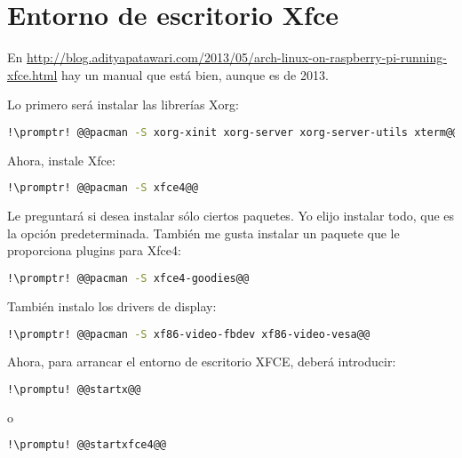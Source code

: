 \section{Entorno de escritorio Xfce}\label{sec:rasp-xfce}
En \url{http://blog.adityapatawari.com/2013/05/arch-linux-on-raspberry-pi-running-xfce.html} hay un manual que
está bien, aunque es de 2013.

Lo primero será instalar las librerías Xorg:

\begin{lstlisting}[gobble=2,language=bash,style=bashinteract,escapechar=!]
  !\promptr! @@pacman -S xorg-xinit xorg-server xorg-server-utils xterm@@
\end{lstlisting}

\noindent Ahora, instale Xfce:

\begin{lstlisting}[gobble=2,language=bash,style=bashinteract,escapechar=!]
  !\promptr! @@pacman -S xfce4@@
\end{lstlisting}

\noindent Le preguntará si desea instalar sólo ciertos paquetes. Yo elijo instalar todo, que es la opción
predeterminada. También me gusta instalar un paquete que le proporciona plugins para Xfce4:

\begin{lstlisting}[gobble=2,language=bash,style=bashinteract,escapechar=!]
  !\promptr! @@pacman -S xfce4-goodies@@
\end{lstlisting}

\noindent También instalo los drivers de display:

\begin{lstlisting}[gobble=2,language=bash,style=bashinteract,escapechar=!]
  !\promptr! @@pacman -S xf86-video-fbdev xf86-video-vesa@@
\end{lstlisting}

Ahora, para arrancar el entorno de escritorio XFCE, deberá introducir:

\begin{lstlisting}[gobble=2,language=bash,style=bashinteract,escapechar=!]
  !\promptu! @@startx@@
\end{lstlisting}

\noindent o

\begin{lstlisting}[gobble=2,language=bash,style=bashinteract,escapechar=!]
  !\promptu! @@startxfce4@@
\end{lstlisting}

